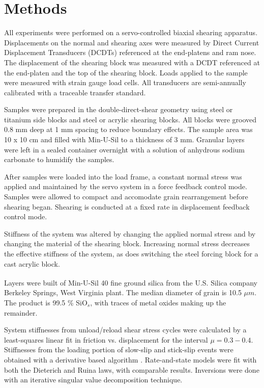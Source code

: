 \documentclass[11pt]{article}
\begin{document}
\section{Methods}
All experiments were performed on a servo-controlled biaxial shearing apparatus.
Displacements on the normal and shearing axes were measured by Direct Current
Displacement Transducers (DCDTs) referenced at the end-platens and ram nose. The
displacement of the shearing block was measured with a DCDT referenced at the
end-platen and the top of the shearing block. Loads applied to the sample were
measured with strain gauge load cells. All transducers are semi-annually
calibrated with a traceable transfer standard.

Samples were prepared in the double-direct-shear geometry using steel or
titanium side blocks and steel or acrylic shearing blocks. All blocks were
grooved 0.8 mm deep at 1 mm spacing to reduce boundary effects. The sample area
was 10 x 10 cm and filled with Min-U-Sil to a thickness of 3 mm. Granular layers
were left in a sealed container overnight with a solution of anhydrous sodium
carbonate to humidify the samples.

After samples were loaded into the load frame, a constant normal stress was
applied and maintained by the servo system in a force feedback control mode.
Samples were allowed to compact and accomodate grain rearrangement before
shearing began. Shearing is conducted at a fixed rate in displacement feedback
control mode.

Stiffness of the system was altered by changing the applied normal stress and by
changing the material of the shearing block. Increasing normal stress decreases
the effective stiffness of the system, as does switching the steel forcing block
for a cast acrylic block.

Layers were built of Min-U-Sil\textsuperscript{\textregistered} 40 fine ground
silica from the U.S. Silica\textsuperscript{\textregistered} company Berkeley
Springs, West Virginia plant. The median diameter of grain is 10.5 $\mu m$. The
product is 99.5 \% SiO$_s$, with traces of metal oxides making up the remainder.

System stiffnesses from unload/reload shear stress cycles were calculated by a
least-squares linear fit in friction vs. displacement for the interval $\mu =
0.3-0.4$. Stiffnesses from the loading portion of slow-slip and stick-slip
events were obtained with a derivative based algorithm \cite{Leeman:2015}.
Rate-and-state models were fit with both the Dieterich and
Ruina laws, with comparable results. Inversions were done with an iterative
singular value decomposition technique.
\end{document}
